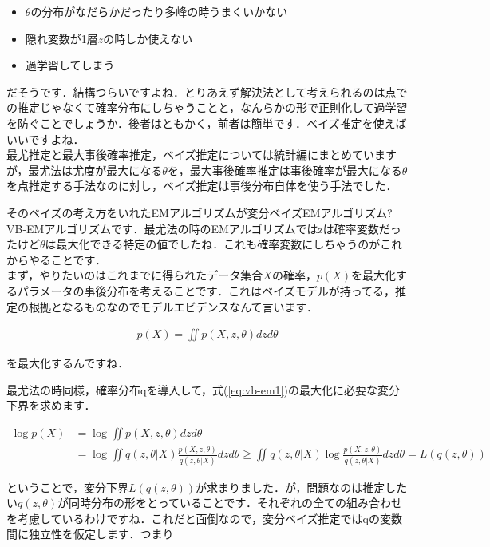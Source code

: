 \documentclass[11pt,a4paper]{ujreport}
\begin{document}
\begin{itemize}
  \item $\theta$の分布がなだらかだったり多峰の時うまくいかない
  \item 隠れ変数が1層$z$の時しか使えない
  \item 過学習してしまう
\end{itemize}

だそうです．結構つらいですよね．とりあえず解決法として考えられるのは点での推定じゃなくて確率分布にしちゃうことと，なんらかの形で正則化して過学習を防ぐことでしょうか．後者はともかく，前者は簡単です．ベイズ推定を使えばいいですよね．\\

最尤推定と最大事後確率推定，ベイズ推定については統計編にまとめていますが，最尤法は尤度が最大になる$\theta$を，最大事後確率推定は事後確率が最大になる$\theta$を点推定する手法なのに対し，ベイズ推定は事後分布自体を使う手法でした．

そのベイズの考え方をいれたEMアルゴリズムが変分ベイズEMアルゴリズム?VB-EMアルゴリズムです．最尤法の時のEMアルゴリズムではzは確率変数だったけど$\theta$は最大化できる特定の値でしたね．これも確率変数にしちゃうのがこれからやることです．\\

まず，やりたいのはこれまでに得られたデータ集合$X$の確率，$p(X)$を最大化するパラメータの事後分布を考えることです．これはベイズモデルが持ってる，推定の根拠となるものなのでモデルエビデンスなんて言います．

\begin{align}
  \label{eq:vb-em1}
  p(X) = \iint p(X,z,\theta)dzd\theta
\end{align}

を最大化するんですね．

最尤法の時同様，確率分布qを導入して，式(\ref{eq:vb-em1})の最大化に必要な変分下界を求めます．

\begin{align}
  \log p(X) &= \log \iint p(X,z,\theta)dzd\theta\\
  &=\log \iint q(z,\theta|X)\frac{p(X,z,\theta)}{q(z,\theta|X)}dzd\theta \geq \iint q(z,\theta|X) \log \frac{p(X,z,\theta)}{q(z,\theta|X)}dzd\theta = L(q(z,\theta))
\end{align}

ということで，変分下界$L(q(z,\theta))$が求まりました．が，問題なのは推定したい$q(z,\theta)$が同時分布の形をとっていることです．それぞれの全ての組み合わせを考慮しているわけですね．これだと面倒なので，変分ベイズ推定ではqの変数間に独立性を仮定します．つまり
\end{document}
